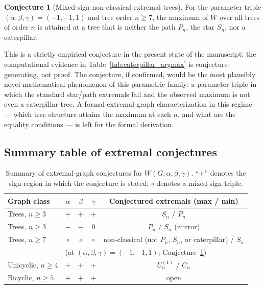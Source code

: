 \documentclass[11pt,a4paper]{article}
\theoremstyle{definition}
\newtheorem{conjecture}[theorem]{Conjecture}
\newcommand{\Wuzi}{W(G;\alpha,\beta,\gamma)}
\begin{document}
\begin{conjecture}[Mixed-sign non-classical extremal trees]
\label{conj:caterpillar_max}
For the parameter triple $(\alpha, \beta, \gamma) = (-1, -1, 1)$
and tree order $n \ge 7$, the maximum of $W$ over all trees of
order $n$ is attained at a tree that is neither the path $P_n$,
the star $S_n$, nor a caterpillar.
\end{conjecture}

This is a strictly empirical conjecture in the present state of
the manuscript: the computational evidence in
Table~\ref{tab:caterpillar_argmax} is conjecture-generating, not
proof. The conjecture, if confirmed, would be the most plausibly
novel mathematical phenomenon of this parametric family: a
parameter triple in which the standard star/path extremals fail
and the observed maximum is not even a caterpillar tree. A
formal extremal-graph characterization in this regime --- which
tree structure attains the maximum at each $n$, and what are
the equality conditions --- is left for the formal derivation.

\subsection{Summary table of extremal conjectures}

\begin{table}[h]
\centering
\caption{Summary of extremal-graph conjectures for $\Wuzi$. ``$+$'' denotes the sign region in which the conjecture is stated; $\circ$ denotes a mixed-sign triple.}
\label{tab:extremals}
\begin{tabular}{lcccc}
\toprule
Graph class & $\alpha$ & $\beta$ & $\gamma$ & Conjectured extremals (max / min)\\
\midrule
Trees, $n\ge 3$ & $+$ & $+$ & $+$ & $S_n$ / $P_n$\\
Trees, $n\ge 3$ & $-$ & $-$ & $0$ & $P_n$ / $S_n$ (mirror)\\
Trees, $n\ge 7$ & $\circ$ & $\circ$ & $\circ$ & non-classical (not $P_n$, $S_n$, or caterpillar) / $S_n$\\
                & \multicolumn{4}{l}{\quad (at $(\alpha,\beta,\gamma)=(-1,-1,1)$; Conjecture~\ref{conj:caterpillar_max})}\\
Unicyclic, $n\ge 4$ & $+$ & $+$ & $+$ & $U_n^{(1)}$ / $C_n$\\
Bicyclic, $n\ge 5$ & $+$ & $+$ & $+$ & open\\
\bottomrule
\end{tabular}
\end{table}
\end{document}
